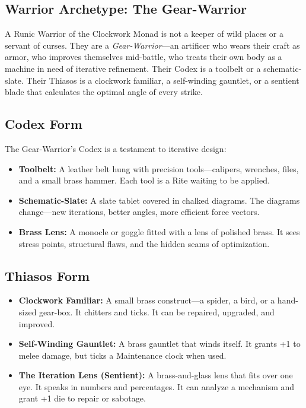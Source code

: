 \subsection{Warrior Archetype: The Gear-Warrior}

A Runic Warrior of the Clockwork Monad is not a keeper of wild places or a servant of curses. They are a \textit{Gear-Warrior}—an artificer who wears their craft as armor, who improves themselves mid-battle, who treats their own body as a machine in need of iterative refinement. Their Codex is a toolbelt or a schematic-slate. Their Thiasos is a clockwork familiar, a self-winding gauntlet, or a sentient blade that calculates the optimal angle of every strike.

\subsection{Codex Form}

The Gear-Warrior's Codex is a testament to iterative design:

\begin{itemize}
\item \textbf{Toolbelt:} A leather belt hung with precision tools—calipers, wrenches, files, and a small brass hammer. Each tool is a Rite waiting to be applied.
\item \textbf{Schematic-Slate:} A slate tablet covered in chalked diagrams. The diagrams change—new iterations, better angles, more efficient force vectors.
\item \textbf{Brass Lens:} A monocle or goggle fitted with a lens of polished brass. It sees stress points, structural flaws, and the hidden seams of optimization.
\end{itemize}

\subsection{Thiasos Form}

\begin{itemize}
\item \textbf{Clockwork Familiar:} A small brass construct—a spider, a bird, or a hand-sized gear-box. It chitters and ticks. It can be repaired, upgraded, and improved.
\item \textbf{Self-Winding Gauntlet:} A brass gauntlet that winds itself. It grants +1 to melee damage, but ticks a Maintenance clock when used.
\item \textbf{The Iteration Lens (Sentient):} A brass-and-glass lens that fits over one eye. It speaks in numbers and percentages. It can analyze a mechanism and grant +1 die to repair or sabotage.
\end{itemize}

